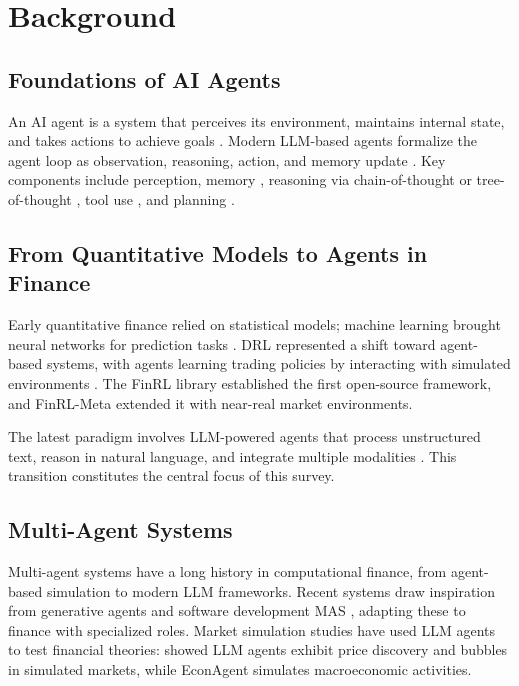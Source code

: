 \documentclass[12pt]{report}
\begin{document}
\chapter{Background}

\section{Foundations of AI Agents}

An AI agent is a system that perceives its environment, maintains internal state, and takes actions to achieve goals \citep{wooldridge1995intelligent,russell2010artificial}. Modern LLM-based agents formalize the agent loop as observation, reasoning, action, and memory update \citep{wang2024survey_agents,xi2023rise}. Key components include perception, memory \citep{park2023generative}, reasoning via chain-of-thought \citep{wei2022chain} or tree-of-thought \citep{yao2023tree}, tool use \citep{schick2024toolformer}, and planning \citep{huang2024understanding}.

\section{From Quantitative Models to Agents in Finance}

Early quantitative finance relied on statistical models; machine learning brought neural networks for prediction tasks \citep{dixon2020machine}. DRL represented a shift toward agent-based systems, with agents learning trading policies by interacting with simulated environments \citep{hambly2023recent}. The FinRL library \citep{liu2020finrl,liu2021finrl} established the first open-source framework, and FinRL-Meta \citep{liu2022finrlmeta} extended it with near-real market environments.

The latest paradigm involves LLM-powered agents that process unstructured text, reason in natural language, and integrate multiple modalities \citep{yang2023fingpt,zhang2024finagent}. This transition constitutes the central focus of this survey.

\section{Multi-Agent Systems}

Multi-agent systems have a long history in computational finance, from agent-based simulation \citep{lebaron2006agent} to modern LLM frameworks. Recent systems draw inspiration from generative agents \citep{park2023generative} and software development MAS \citep{qian2024chatdev}, adapting these to finance with specialized roles. Market simulation studies have used LLM agents to test financial theories: \citet{lopezlira2025cantrade} showed LLM agents exhibit price discovery and bubbles in simulated markets, while EconAgent \citep{li2023econagent} simulates macroeconomic activities.
\end{document}
